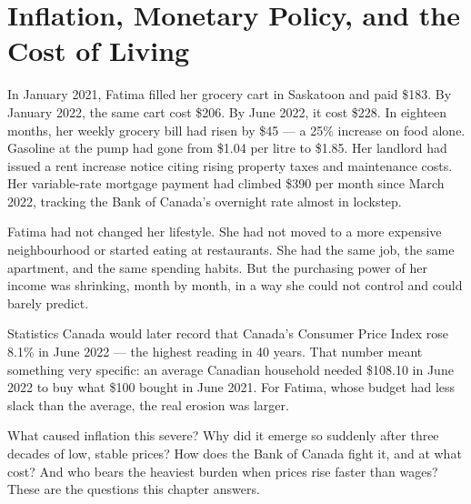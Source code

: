 
\chapter{Inflation, Monetary Policy, and the Cost of Living}
\label{ch:inflation}


\noindent In January 2021, Fatima filled her grocery cart in Saskatoon and
paid \$183. By January 2022, the same cart cost \$206. By June 2022, it
cost \$228. In eighteen months, her weekly grocery bill had risen by
\$45 --- a 25\% increase on food alone. Gasoline at the pump had gone from
\$1.04 per litre to \$1.85. Her landlord had issued a rent increase notice
citing rising property taxes and maintenance costs. Her variable-rate
mortgage payment had climbed \$390 per month since March 2022, tracking the
Bank of Canada's overnight rate almost in lockstep.

Fatima had not changed her lifestyle. She had not moved to a more expensive
neighbourhood or started eating at restaurants. She had the same job, the
same apartment, and the same spending habits. But the purchasing power of
her income was shrinking, month by month, in a way she could not control
and could barely predict.

Statistics Canada would later record that Canada's Consumer Price Index rose
8.1\% in June 2022 --- the highest reading in 40 years. That number meant
something very specific: an average Canadian household needed \$108.10 in
June 2022 to buy what \$100 bought in June 2021. For Fatima, whose budget
had less slack than the average, the real erosion was larger.

What caused inflation this severe? Why did it emerge so suddenly after three
decades of low, stable prices? How does the Bank of Canada fight it, and
at what cost? And who bears the heaviest burden when prices rise faster
than wages? These are the questions this chapter answers.


